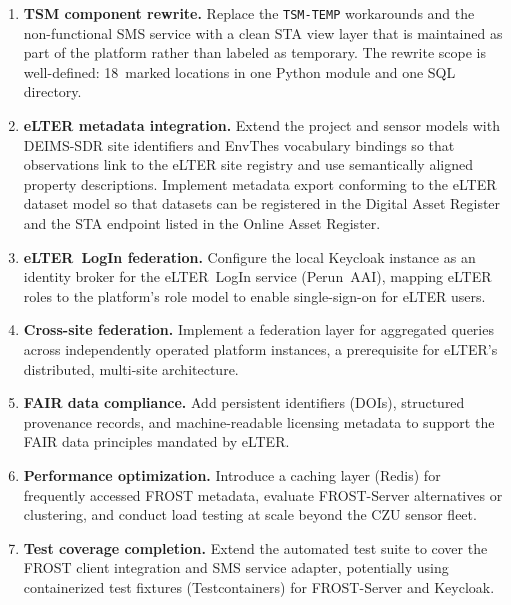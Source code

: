 \begin{enumerate}
  \item \textbf{TSM component rewrite.} Replace the \texttt{TSM-TEMP} workarounds
        and the non-functional SMS service with a clean STA view layer that is maintained
        as part of the platform rather than labeled as temporary. The rewrite scope is
        well-defined: 18~marked locations in one Python module and one SQL directory.

  \item \textbf{eLTER metadata integration.} Extend the project and sensor models
        with DEIMS-SDR site identifiers and EnvThes vocabulary bindings so that
        observations link to the eLTER site registry and use semantically aligned
        property descriptions. Implement metadata export conforming to the eLTER
        dataset model so that datasets can be registered in the Digital Asset
        Register and the STA endpoint listed in the Online Asset Register.

  \item \textbf{eLTER~LogIn federation.} Configure the local Keycloak instance as
        an identity broker for the eLTER~LogIn service (Perun~AAI), mapping eLTER
        roles to the platform's role model to enable single-sign-on for eLTER users.

  \item \textbf{Cross-site federation.} Implement a federation layer for aggregated
        queries across independently operated platform instances, a prerequisite for
        eLTER's distributed, multi-site architecture.

  \item \textbf{FAIR data compliance.} Add persistent identifiers (DOIs), structured
        provenance records, and machine-readable licensing metadata to support the FAIR
        data principles mandated by eLTER.

  \item \textbf{Performance optimization.} Introduce a caching layer (Redis) for
        frequently accessed FROST metadata, evaluate FROST-Server alternatives or
        clustering, and conduct load testing at scale beyond the CZU sensor fleet.

  \item \textbf{Test coverage completion.} Extend the automated test suite to cover the
        FROST client integration and SMS service adapter, potentially using
        containerized test fixtures (Testcontainers) for FROST-Server and Keycloak.
\end{enumerate}

